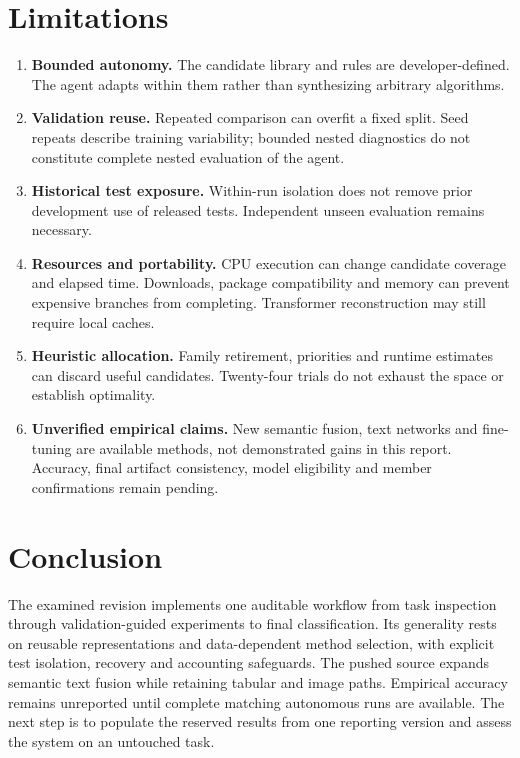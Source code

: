 \documentclass[11pt,a4paper]{article}
\begin{document}
\section{Limitations}
\begin{enumerate}
\item \textbf{Bounded autonomy.} The candidate library and rules are developer-defined. The agent adapts within them rather than synthesizing arbitrary algorithms.
\item \textbf{Validation reuse.} Repeated comparison can overfit a fixed split. Seed repeats describe training variability; bounded nested diagnostics do not constitute complete nested evaluation of the agent.
\item \textbf{Historical test exposure.} Within-run isolation does not remove prior development use of released tests. Independent unseen evaluation remains necessary.
\item \textbf{Resources and portability.} CPU execution can change candidate coverage and elapsed time. Downloads, package compatibility and memory can prevent expensive branches from completing. Transformer reconstruction may still require local caches.
\item \textbf{Heuristic allocation.} Family retirement, priorities and runtime estimates can discard useful candidates. Twenty-four trials do not exhaust the space or establish optimality.
\item \textbf{Unverified empirical claims.} New semantic fusion, text networks and fine-tuning are available methods, not demonstrated gains in this report. Accuracy, final artifact consistency, model eligibility and member confirmations remain pending.
\end{enumerate}

\section{Conclusion}
The examined revision implements one auditable workflow from task inspection through validation-guided experiments to final classification. Its generality rests on reusable representations and data-dependent method selection, with explicit test isolation, recovery and accounting safeguards. The pushed source expands semantic text fusion while retaining tabular and image paths. Empirical accuracy remains unreported until complete matching autonomous runs are available. The next step is to populate the reserved results from one reporting version and assess the system on an untouched task.
\end{document}
